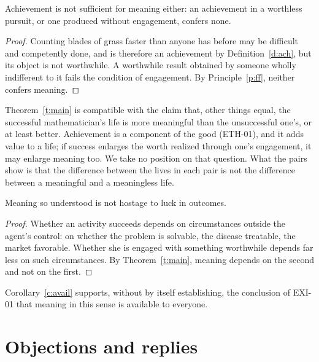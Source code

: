 \documentclass{situationist-preprint}
\begin{document}
\begin{corollary}\label{c:neither}
Achievement is not sufficient for meaning either: an achievement in a worthless pursuit, or one produced without engagement, confers none.
\end{corollary}

\begin{proof}
Counting blades of grass faster than anyone has before may be difficult and competently done, and is therefore an achievement by Definition~\ref{d:ach}, but its object is not worthwhile. A worthwhile result obtained by someone wholly indifferent to it fails the condition of engagement. By Principle~\ref{p:ff}, neither confers meaning.
\end{proof}

\begin{remark}[Degree]\label{r:degree}
Theorem~\ref{t:main} is compatible with the claim that, other things equal, the successful mathematician's life is more meaningful than the unsuccessful one's, or at least better. Achievement is a component of the good (ETH-01), and it adds value to a life; if success enlarges the worth realized through one's engagement, it may enlarge meaning too. We take no position on that question. What the pairs show is that the difference between the lives in each pair is not the difference between a meaningful and a meaningless life.
\end{remark}

\begin{corollary}[Availability]\label{c:avail}
Meaning so understood is not hostage to luck in outcomes.
\end{corollary}

\begin{proof}
Whether an activity succeeds depends on circumstances outside the agent's control: on whether the problem is solvable, the disease treatable, the market favorable. Whether she is engaged with something worthwhile depends far less on such circumstances. By Theorem~\ref{t:main}, meaning depends on the second and not on the first.
\end{proof}

Corollary~\ref{c:avail} supports, without by itself establishing, the conclusion of EXI-01 that meaning in this sense is available to everyone.

\section{Objections and replies}
\end{document}
